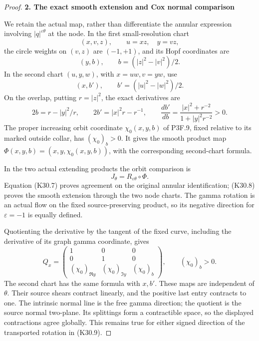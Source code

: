 \begin{proof}
\par

\medskip\noindent\textbf{2. The exact smooth extension and Cox normal comparison}

\par\nobreak

We retain the actual map, rather than differentiate the annular
expression involving \(|q|^{\varepsilon\theta}\) at the node.
In the first small-resolution chart
\[
 (x,v,z),\qquad u=xz,\quad y=vz,
\]
the circle weights on \((v,z)\) are \((-1,+1)\), and its
Hopf coordinates are
\[
                (y,b),\qquad b=(|z|^2-|v|^2)/2.
\]
In the second chart \((u,y,w)\), with \(x=uw,v=yw\), use
\[
                (x,b'),\qquad b'=(|u|^2-|w|^2)/2.
\]
On the overlap, putting \(r=|z|^2\), the exact derivatives are
\[
 2b=r-|y|^2/r,\qquad
 2b'=|x|^2r-r^{-1},\qquad
 \frac{db'}{db}
   =\frac{|x|^2+r^{-2}}{1+|y|^2r^{-2}}>0.
 \tag{K30.8}
\]
The proper increasing orbit coordinate \(\chi_0(x,y,b)\)
of P3F.9, fixed relative to its marked outside collar,
has \((\chi_0)_b>0\). It gives the smooth product map
\(\Phi(x,y,b)=(x,y,\chi_0(x,y,b))\), with the corresponding
second-chart formula.

In the two actual extending products the orbit comparison is
\[
                       J_\theta=R_{\varepsilon\theta}\circ\Phi.
 \tag{K30.9}
\]
Equation (K30.7) proves agreement on the original annular
identification; (K30.8) proves the smooth extension through the
two node charts. The gamma rotation is an actual flow on the
fixed source-preserving product, so its negative direction for
\(\varepsilon=-1\) is equally defined.

Quotienting the derivative by the tangent of the fixed curve,
including the derivative of its graph gamma coordinate, gives
\[
 Q_x=
 \begin{pmatrix}
 1&0&0\\0&1&0\\
 (\chi_0)_{\Re y}&(\chi_0)_{\Im y}&(\chi_0)_b
 \end{pmatrix},
 \qquad(\chi_0)_b>0 .
 \tag{K30.10}
\]
The second chart has the same formula with \(x,b'\).
These maps are independent of \(\theta\). Their source shears
contract linearly, and the positive last entry contracts to one.
The intrinsic normal line is the free gamma direction; the
quotient is the source normal two-plane. Its splittings form
a contractible space, so the displayed contractions agree
globally. This remains true for either signed direction of
the transported rotation in (K30.9).


\end{proof}
